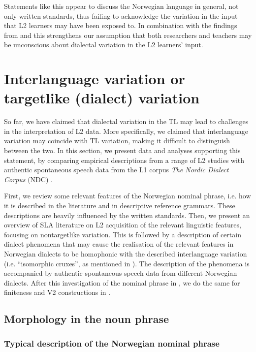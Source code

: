 \documentclass[output=paper,colorlinks,citecolor=brown,modfonts,nonflat]{../langscibook}
\begin{document}
Statements like this appear to discuss the Norwegian language in general, not only written standards, thus failing to acknowledge the variation in the input that L2 learners may have been exposed to. In combination with the findings from \citet{Heide2017} and \citet{Husby2009} this strengthens our assumption that both researchers and teachers may be unconscious about dialectal variation in the L2 learners’ input.

\section{Interlanguage variation or targetlike (dialect) variation}\label{sec:emilsen:3}

So far, we have claimed that dialectal variation in the TL may lead to challenges in the interpretation of L2 data. More specifically, we claimed that interlanguage variation may coincide with TL variation, making it difficult to distinguish between the two. In this section, we present data and analyses supporting this statement, by comparing empirical descriptions from a range of L2 studies with authentic spontaneous speech data from the L1 corpus \textit{The Nordic Dialect Corpus} (NDC) \citep{JohannessenEtAl2009}.

First, we review some relevant features of the Norwegian nominal phrase, i.e. how it is described in the literature and in descriptive reference grammars. These descriptions are heavily influenced by the written standards. Then, we present an overview of SLA literature on L2 acquisition of the relevant linguistic features, focusing on nontargetlike variation. This is followed by a description of certain dialect phenomena that may cause the realisation of the relevant features in Norwegian dialects to be homophonic with the described interlanguage variation (i.e. ``isomorphic cruxes'', as mentioned in ). The description of the phenomena is accompanied by authentic spontaneous speech data from different Norwegian dialects. After this investigation of the nominal phrase in , we do the same for finiteness and V2 constructions in .

\subsection{Morphology in the noun phrase}\label{sec:emilsen:3.1}
\subsubsection{Typical description of the Norwegian nominal phrase}
\end{document}
